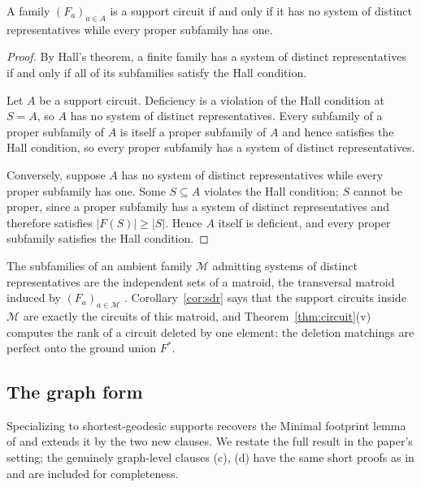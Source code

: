 \begin{corollary}\label{cor:sdr}
A family \((F_a)_{a\in A}\) is a support circuit if and only if it has
no system of distinct representatives while every proper subfamily has
one.
\end{corollary}

\begin{proof}
By Hall's theorem, a finite family has a system of distinct
representatives if and only if all of its subfamilies satisfy the Hall
condition.

Let \(A\) be a support circuit. Deficiency is a violation of the Hall
condition at \(S=A\), so \(A\) has no system of distinct
representatives. Every subfamily of a proper subfamily of \(A\) is
itself a proper subfamily of \(A\) and hence satisfies the Hall
condition, so every proper subfamily has a system of distinct
representatives.

Conversely, suppose \(A\) has no system of distinct representatives
while every proper subfamily has one. Some \(S\subseteq A\) violates
the Hall condition; \(S\) cannot be proper, since a proper subfamily
has a system of distinct representatives and therefore satisfies
\(|F(S)|\ge|S|\). Hence \(A\) itself is deficient, and every proper
subfamily satisfies the Hall condition.
\end{proof}

\begin{remark}\label{rem:matroid}
The subfamilies of an ambient family \(\mathcal M\) admitting systems
of distinct representatives are the independent sets of a matroid, the
transversal matroid induced by \((F_a)_{a\in\mathcal M}\)
\cite{EdmondsFulkerson65}. Corollary~\ref{cor:sdr} says that the
support circuits inside \(\mathcal M\) are exactly the circuits of this
matroid, and Theorem~\ref{thm:circuit}(v) computes the rank of a
circuit deleted by one element: the deletion matchings are perfect onto
the ground union \(F^{*}\).
\end{remark}

\subsection{The graph form}

Specializing to shortest-geodesic supports recovers the Minimal
footprint lemma of \cite{Ferudun26supports} and extends it by the two
new clauses. We restate the full result in the paper's setting; the
genuinely graph-level clauses (c), (d) have the same short proofs as in
\cite{Ferudun26supports} and are included for completeness.

